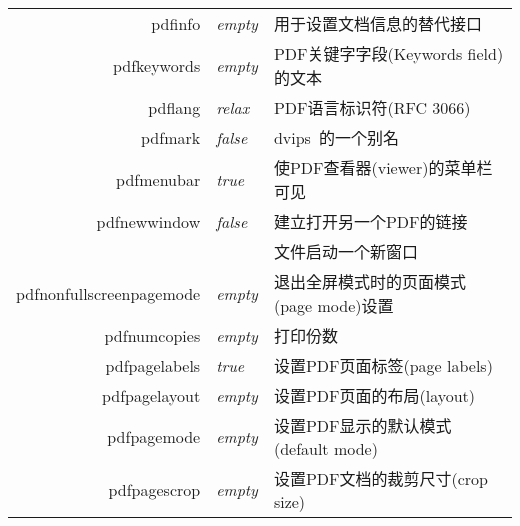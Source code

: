\documentclass{article}
\begin{document}
\begin{longtable}{@{}>{\ttfamily}rlp{7cm}@{}}
  pdfinfo                           & \textit{empty}         & 用于设置文档信息的替代接口                                                                                   \\
  pdfkeywords                       & \textit{empty}         & PDF关键字字段(Keywords field)的文本                                                                     \\
  pdflang                           & \textit{relax}         & PDF语言标识符(RFC 3066)                                                                              \\
  pdfmark                           & \textit{false}         & \textsf{dvips}\ 的一个别名                                                                           \\
  pdfmenubar                        & \textit{true}          & 使PDF查看器(viewer)的菜单栏可见                                                                           \\
  pdfnewwindow                      & \textit{false}         & 建立打开另一个PDF的链接                                                                                   \\
                                    &                        & 文件启动一个新窗口                                                                                       \\
  pdfnonfullscreenpagemode
                                    & \textit{empty}         & 退出全屏模式时的页面模式(page mode)设置                                                                       \\
  pdfnumcopies                      & \textit{empty}         & 打印份数                                                                                            \\
  pdfpagelabels                     & \textit{true}          & 设置PDF页面标签(page labels)                                                                          \\
  pdfpagelayout                     & \textit{empty}         & 设置PDF页面的布局(layout)                                                                              \\
  pdfpagemode                       & \textit{empty}         & 设置PDF显示的默认模式(default mode)                                                                      \\
  pdfpagescrop                      & \textit{empty}         & 设置PDF文档的裁剪尺寸(crop size)                                                                         \\

\end{longtable}
\end{document}
